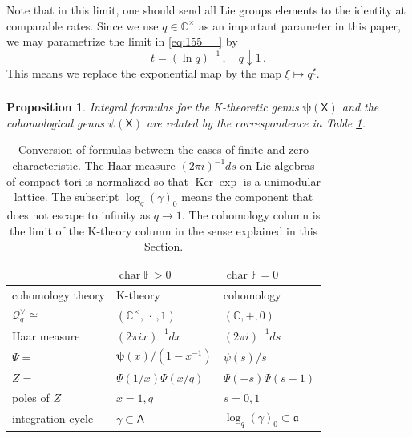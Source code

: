 \documentclass[14pt]{extarticle}
\newcommand{\C}{\mathbb{C}}
\newcommand{\Ct}{\mathbb{C}^\times}
\newcommand{\F}{\mathbb{F}}
\newcommand{\bA}{\mathsf{A}}
\newcommand{\bX}{\mathsf{X}}
\newcommand{\cQ}{\mathscr{Q}}
\newcommand{\bpsi}{\boldsymbol{\psi}}
\newcommand{\fa}{\mathfrak{a}}
\DeclareMathOperator{\Ker}{Ker}
\DeclareMathOperator{\chr}{char}
\newtheorem{Proposition}[Lemma]{Proposition}
\theoremstyle{definition}
\begin{document}
Note that in this limit, one should send all Lie groups elements to
the identity at comparable rates. Since we use $q\in \Ct$ as an
important parameter in this paper, we may parametrize the limit 
in \eqref{eq:155__} by
\[
  t = \left(\ln q\right)^{-1} \,, \quad q \downarrow 1 \,.
\]
This means we replace the exponential map by the map $\xi \mapsto
q^\xi$. 



\subsubsection{}

\begin{Proposition}\label{p_int_limit}
  Integral formulas for the  K-theoretic genus $\bpsi(\bX)$
  and the cohomological genus $\psi(\bX)$ are related by
  the correspondence in Table \ref{tab1}. 
\end{Proposition}


\begin{table}[!h]
  \centering
  \small
\begin{tabularx}{0.8\textwidth}
 { 
  | >{\centering\arraybackslash}X 
  | >{\centering\arraybackslash}X 
  | >{\centering\arraybackslash}X | }
 \hline
 & $\chr\F >0$ & $\chr\F=0$ \\
 \hline
  cohomology theory  & K-theory  & cohomology  \\
 \hline 
 $\cQ_q^\vee\cong $ & $(\Ct,\, \cdot \,,1)$  & $(\C,+,0)$\\
 \hline
 Haar measure & $ (2\pi i x)^{-1}  dx$& $ (2\pi i)^{-1}  d s$ \\
 \hline 
$\Psi=$  &  $\bpsi(x)/(1-x^{-1})$ & $\psi(s)/s$\\
\hline
$Z=$  &  $\Psi(1/x) \Psi(x/q)$ & $\Psi(-s) \Psi(s-1)$ \\
\hline
poles of $Z$ &  $x=1,q$  & $s=0,1$ \\
\hline
integration cycle & $\gamma \subset \bA$ & $\log_q(\gamma)_0 \subset
\fa$ \\
\hline 
\end{tabularx}
\caption{Conversion of formulas between the cases of finite and zero
  characteristic. The Haar measure $(2\pi i)^{-1}  d s$ on Lie algebras of
  compact tori is normalized
  so that $\Ker \exp$ is a unimodular lattice. The subscript
  $\log_q(\gamma)_0$ means the component that does not escape to
  infinity as $q\to 1$. The cohomology column is the limit of the 
K-theory column in the sense explained in this Section.}
\label{tab1}
\end{table}
\end{document}
